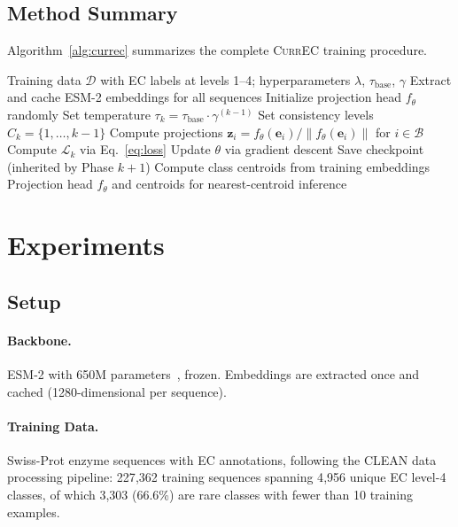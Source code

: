 \documentclass{article}
\newcommand{\currec}{\textsc{CurrEC}}
\newcommand{\loss}{\mathcal{L}}
\begin{document}
\subsection{Method Summary}

Algorithm~\ref{alg:currec} summarizes the complete \currec{} training procedure.

\begin{algorithm}[t]
\caption{\currec{}: Curriculum Contrastive Learning for EC Prediction}
\label{alg:currec}
\begin{algorithmic}[1]
\REQUIRE Training data $\mathcal{D}$ with EC labels at levels 1--4; hyperparameters $\lambda$, $\tau_{\text{base}}$, $\gamma$
\STATE Extract and cache ESM-2 embeddings for all sequences
\STATE Initialize projection head $f_\theta$ randomly
    \STATE Set temperature $\tau_k = \tau_{\text{base}} \cdot \gamma^{(k-1)}$
    \STATE Set consistency levels $C_k = \{1, \dots, k-1\}$
            \STATE Compute projections $\mathbf{z}_i = f_\theta(\mathbf{e}_i) / \|f_\theta(\mathbf{e}_i)\|$ for $i \in \mathcal{B}$
            \STATE Compute $\loss_k$ via Eq.~\ref{eq:loss}
            \STATE Update $\theta$ via gradient descent
        \ENDFOR
    \ENDFOR
    \STATE Save checkpoint (inherited by Phase $k+1$)
\ENDFOR
\STATE Compute class centroids from training embeddings
\RETURN Projection head $f_\theta$ and centroids for nearest-centroid inference
\end{algorithmic}
\end{algorithm}

\section{Experiments}\label{sec:experiments}

\subsection{Setup}

\paragraph{Backbone.} ESM-2 with 650M parameters~\citep{lin2023evolutionary}, frozen. Embeddings are extracted once and cached (1280-dimensional per sequence).

\paragraph{Training Data.} Swiss-Prot enzyme sequences with EC annotations, following the CLEAN data processing pipeline: 227{,}362 training sequences spanning 4{,}956 unique EC level-4 classes, of which 3{,}303 (66.6\%) are rare classes with fewer than 10 training examples.
\end{document}
